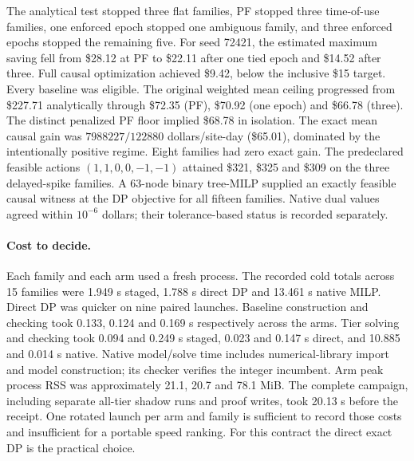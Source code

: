 \documentclass[11pt,letterpaper]{article}
\begin{document}
The analytical test stopped three flat families, PF stopped three time-of-use families, one enforced epoch stopped one ambiguous family, and three enforced epochs stopped the remaining five. For seed 72421, the estimated maximum saving fell from \$28.12 at PF to \$22.11 after one tied epoch and \$14.52 after three. Full causal optimization achieved \$9.42, below the inclusive \$15 target. Every baseline was eligible. The original weighted mean ceiling progressed from \$227.71 analytically through \$72.35 (PF), \$70.92 (one epoch) and \$66.78 (three). The distinct penalized PF floor implied \$68.78 in isolation. The exact mean causal gain was $7988227/122880$ dollars/site-day (\$65.01), dominated by the intentionally positive regime. Eight families had zero exact gain. The predeclared feasible actions $(1,1,0,0,-1,-1)$ attained \$321, \$325 and \$309 on the three delayed-spike families. A 63-node binary tree-MILP supplied an exactly feasible causal witness at the DP objective for all fifteen families. Native dual values agreed within $10^{-6}$ dollars; their tolerance-based status is recorded separately.

\paragraph{Cost to decide.}
Each family and each arm used a fresh process. The recorded cold totals across 15 families were 1.949 s staged, 1.788 s direct DP and 13.461 s native MILP. Direct DP was quicker on nine paired launches. Baseline construction and checking took 0.133, 0.124 and 0.169 s respectively across the arms. Tier solving and checking took 0.094 and 0.249 s staged, 0.023 and 0.147 s direct, and 10.885 and 0.014 s native. Native model/solve time includes numerical-library import and model construction; its checker verifies the integer incumbent. Arm peak process RSS was approximately 21.1, 20.7 and 78.1 MiB. The complete campaign, including separate all-tier shadow runs and proof writes, took 20.13 s before the receipt. One rotated launch per arm and family is sufficient to record those costs and insufficient for a portable speed ranking. For this contract the direct exact DP is the practical choice.
\end{document}
